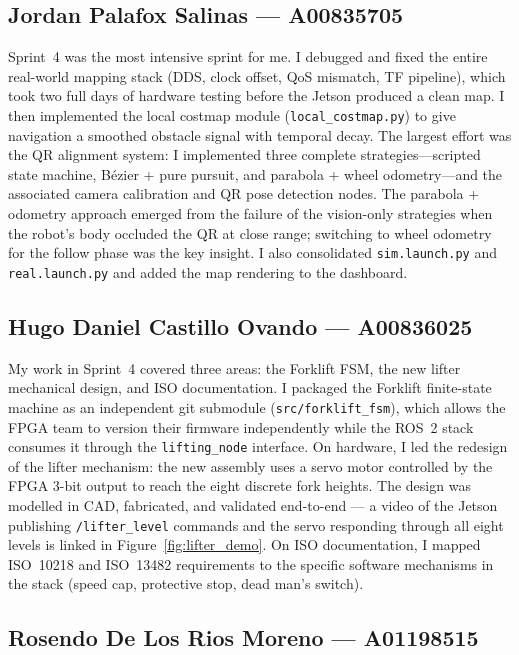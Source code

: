 \documentclass[conference]{IEEEtran}
\begin{document}
\subsection*{Jordan Palafox Salinas --- A00835705}

Sprint~4 was the most intensive sprint for me. I debugged and fixed the
entire real-world mapping stack (DDS, clock offset, QoS mismatch, TF
pipeline), which took two full days of hardware testing before the Jetson
produced a clean map. I then implemented the local costmap module
(\texttt{local\_costmap.py}) to give navigation a smoothed obstacle signal
with temporal decay. The largest effort was the QR alignment system: I
implemented three complete strategies---scripted state machine, Bézier +
pure pursuit, and parabola + wheel odometry---and the associated camera
calibration and QR pose detection nodes. The parabola + odometry approach
emerged from the failure of the vision-only strategies when the robot's body
occluded the QR at close range; switching to wheel odometry for the follow
phase was the key insight. I also consolidated \texttt{sim.launch.py} and
\texttt{real.launch.py} and added the map rendering to the dashboard.

\subsection*{Hugo Daniel Castillo Ovando --- A00836025}

My work in Sprint~4 covered three areas: the Forklift FSM, the new lifter
mechanical design, and ISO documentation. I packaged the Forklift
finite-state machine as an independent git submodule (\texttt{src/forklift\_fsm}),
which allows the FPGA team to version their firmware independently while the
ROS~2 stack consumes it through the \texttt{lifting\_node} interface.
On hardware, I led the redesign of the lifter mechanism: the new assembly
uses a servo motor controlled by the FPGA 3-bit output to reach the eight
discrete fork heights. The design was modelled in CAD, fabricated, and
validated end-to-end — a video of the Jetson publishing \texttt{/lifter\_level}
commands and the servo responding through all eight levels is linked in
Figure~\ref{fig:lifter_demo}. On ISO documentation, I mapped ISO~10218
and ISO~13482 requirements to the specific software mechanisms in the stack
(speed cap, protective stop, dead man's switch).

\subsection*{Rosendo De Los Rios Moreno --- A01198515}
\end{document}
